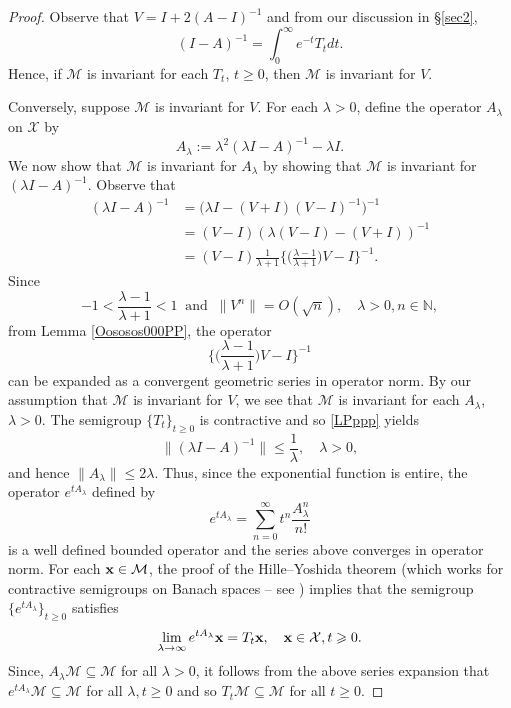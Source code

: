 \documentclass[11pt]{amsart}
\numberwithin{equation}{section}
\theoremstyle{plain}
\theoremstyle{definition}
\def\N{\mathbb{N}}
\renewcommand{\leq}{\leqslant}
\renewcommand{\geq}{\geqslant}
\renewcommand{\subset}{\subseteq}
\renewcommand{\vec}[1]{{\bf #1}}
\newcommand{\0}{{\color{lightgray}0}}
\begin{document}
\begin{proof}
Observe that 
$V = I + 2 (A - I)^{-1}$
and from our discussion in \S\ref{sec2},
$$( I - A)^{-1} = \int_{0}^{\infty} e^{-t} T_t dt.$$ Hence,  if $\mathcal{M}$ is invariant for each $T_t$, $t \geq 0$,  then $\mathcal{M}$ is invariant for $V$. 

Conversely, suppose  $\mathcal{M}$ is invariant for $V$. For each $\lambda > 0$, define the operator $A_{\lambda}$ on $\mathcal{X}$  by 
$$A_{\lambda} := \lambda^2 (\lambda I - A)^{-1} - \lambda I.$$ We now show that $\mathcal{M}$ is invariant for $A_{\lambda}$ by showing that $\mathcal{M}$ is invariant for $(\lambda I - A)^{-1}$. Observe that 
\begin{align*}
(\lambda I - A)^{-1} & = \Big(\lambda I - (V + I)(V - I)^{-1}\Big)^{-1}\\
& = (V - I) (\lambda (V - I)  - (V + I))^{-1}\\
& = (V - I) \frac{1}{\lambda + 1}  \Big\{\Big(\frac{\lambda - 1}{\lambda + 1}\Big) V - I\Big\}^{-1}.
\end{align*}
Since 
$$-1 < \frac{\lambda - 1}{\lambda + 1} < 1 \; \; \mbox{and} \; \; \|V^{n}\| = O(\sqrt{n}), \quad \lambda > 0, n \in \N,$$
from Lemma \ref{Oososos000PP}, the operator 
$$  \Big\{\Big(\frac{\lambda - 1}{\lambda + 1}\Big) V - I\Big\}^{-1}$$
can be expanded as a convergent geometric series in operator norm. By our assumption that  $\mathcal{M}$ is invariant for $V$, we see that $\mathcal{M}$ is invariant for each $A_{\lambda}$, $\lambda > 0$. 
The semigroup $\{T_t\}_{t \geq 0}$ is contractive and so \eqref{LPppp} yields
$$\|(\lambda I - A)^{-1}\| \leq \frac{1}{\lambda}, \quad \lambda > 0,$$
and hence $\|A_{\lambda}\| \leq 2 \lambda$. Thus, since the exponential function is entire, the operator $e^{t A_{\lambda}}$ defined by 
$$e^{t A_{\lambda}} = \sum_{n = 0}^{\infty} t^n \frac{A_{\lambda}^{n}}{n!}$$ is a well defined bounded operator and the series above converges in operator norm.
For each $\vec{x} \in \mathcal{M}$,  the proof of the Hille--Yoshida theorem (which works for contractive semigroups on Banach spaces -- see \cite[p.~144]{MR629828}) implies that the semigroup $\{e^{t A_{\lambda}}\}_{t \geq 0}$ satisfies 
$$
\lim_{\lambda \to \infty} e^{t A_{\lambda}} \vec{x}  = T_{t} \vec{x}, \quad  \vec{x} \in \mathcal{X}, t \geq 0.
$$
Since, $A_{\lambda} \mathcal{M} \subset \mathcal{M}$ for all $\lambda > 0$, it follows from the above series expansion that $e^{t A_{\lambda}} \mathcal{M} \subset \mathcal{M}$ for all $\lambda, t \geq 0$ and so $T_{t} \mathcal{M} \subset \mathcal{M}$ for all $t \geq 0$. 
\end{proof}
 
\end{document}

